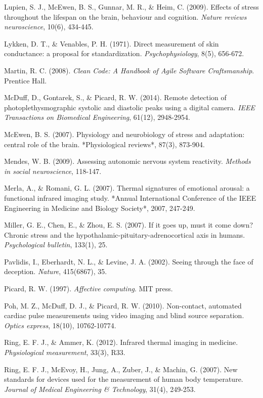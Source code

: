 \documentclass[12pt,a4paper]{article}
\begin{document}
Lupien, S. J., McEwen, B. S., Gunnar, M. R., \& Heim, C. (2009). Effects of stress throughout the lifespan on the brain,
behaviour and cognition. \textit{Nature reviews neuroscience}, 10(6), 434-445.

Lykken, D. T., \& Venables, P. H. (1971). Direct measurement of skin conductance: a proposal for standardization.
\textit{Psychophysiology}, 8(5), 656-672.

Martin, R. C. (2008). \textit{Clean Code: A Handbook of Agile Software Craftsmanship}. Prentice Hall.

McDuff, D., Gontarek, S., \& Picard, R. W. (2014). Remote detection of photoplethysmographic systolic and diastolic peaks
using a digital camera. \textit{IEEE Transactions on Biomedical Engineering}, 61(12), 2948-2954.

McEwen, B. S. (2007). Physiology and neurobiology of stress and adaptation: central role of the brain. *Physiological
reviews*, 87(3), 873-904.

Mendes, W. B. (2009). Assessing autonomic nervous system reactivity. \textit{Methods in social neuroscience}, 118-147.

Merla, A., \& Romani, G. L. (2007). Thermal signatures of emotional arousal: a functional infrared imaging study. *Annual
International Conference of the IEEE Engineering in Medicine and Biology Society*, 2007, 247-249.

Miller, G. E., Chen, E., \& Zhou, E. S. (2007). If it goes up, must it come down? Chronic stress and the
hypothalamic-pituitary-adrenocortical axis in humans. \textit{Psychological bulletin}, 133(1), 25.

Pavlidis, I., Eberhardt, N. L., \& Levine, J. A. (2002). Seeing through the face of deception. \textit{Nature}, 415(6867), 35.

Picard, R. W. (1997). \textit{Affective computing}. MIT press.

Poh, M. Z., McDuff, D. J., \& Picard, R. W. (2010). Non-contact, automated cardiac pulse measurements using video imaging
and blind source separation. \textit{Optics express}, 18(10), 10762-10774.

Ring, E. F. J., \& Ammer, K. (2012). Infrared thermal imaging in medicine. \textit{Physiological measurement}, 33(3), R33.

Ring, E. F. J., McEvoy, H., Jung, A., Zuber, J., \& Machin, G. (2007). New standards for devices used for the measurement
of human body temperature. \textit{Journal of Medical Engineering \& Technology}, 31(4), 249-253.
\end{document}

